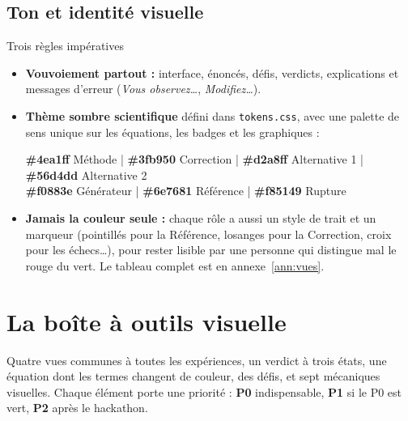 \documentclass[11pt,a4paper]{article}
\newcommand{\pzero}{\colorbox{ctCorrection!18}{\footnotesize\textbf{P0}}}
\newcommand{\pone}{\colorbox{ctMethod!18}{\footnotesize\textbf{P1}}}
\newcommand{\ptwo}{\colorbox{ctBaseline!18}{\footnotesize\textbf{P2}}}
\begin{document}
\subsection{Ton et identité visuelle}
\begin{rulebox}{Trois règles impératives}
  \begin{itemize}[leftmargin=*, nosep]
    \item \textbf{Vouvoiement partout :} interface, énoncés, défis, verdicts, explications et messages d'erreur (\emph{\og Vous observez\dots \fg}, \emph{\og Modifiez\dots \fg}).
    \item \textbf{Thème sombre scientifique} défini dans \texttt{tokens.css}, avec une palette de sens unique sur les équations, les badges et les graphiques :
    \begin{center}
      \small
      \textcolor{ctMethod}{\textbf{\#4ea1ff} Méthode} \quad|\quad
      \textcolor{ctCorrection}{\textbf{\#3fb950} Correction} \quad|\quad
      \textcolor{ctAltOne}{\textbf{\#d2a8ff} Alternative 1} \quad|\quad
      \textcolor{ctAltTwo}{\textbf{\#56d4dd} Alternative 2} \\[2pt]
      \textcolor{ctGenerator}{\textbf{\#f0883e} Générateur} \quad|\quad
      \textcolor{ctBaseline}{\textbf{\#6e7681} Référence} \quad|\quad
      \textcolor{ctBroken}{\textbf{\#f85149} Rupture}
    \end{center}
    \item \textbf{Jamais la couleur seule :} chaque rôle a aussi un style de trait et un marqueur (pointillés pour la Référence, losanges pour la Correction, croix pour les échecs\dots), pour rester lisible par une personne qui distingue mal le rouge du vert. Le tableau complet est en annexe~\ref{ann:vues}.
  \end{itemize}
\end{rulebox}

\section{La boîte à outils visuelle}

\begin{enbref}
Quatre vues communes à toutes les expériences, un verdict à trois états, une équation dont les termes changent de couleur, des défis, et sept mécaniques visuelles. Chaque élément porte une priorité : \pzero{} indispensable, \pone{} si le P0 est vert, \ptwo{} après le hackathon.
\end{enbref}
\end{document}
